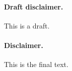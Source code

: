\ifdraft
\paragraph{Draft disclaimer.} This is a draft. %
\else
\paragraph{Disclaimer.} This is the final text. %
\fi
